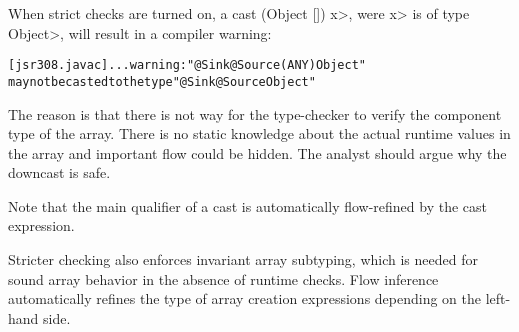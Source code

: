 When strict checks are turned on,
a cast \<(Object []) x>, were \<x> is of type \<Object>, will result
in a compiler warning:

\begin{alltt}
[jsr308.javac] ... warning: "@Sink @Source({ANY}) Object"
       may not be casted to the type "@Sink @Source Object"
\end{alltt}

The reason is that there is not way for the type-checker to verify
 the component type of the array. There is no static knowledge about the actual
runtime values in the array and important flow could be hidden.
The analyst should argue why the downcast is safe.

Note that the main qualifier of a cast is automatically flow-refined
by the cast expression.


\medskip

Stricter checking also enforces invariant array subtyping, which is
needed for sound array behavior in the absence of runtime checks.
Flow inference automatically refines the type of array creation
expressions depending on the left-hand side.

\medskip




